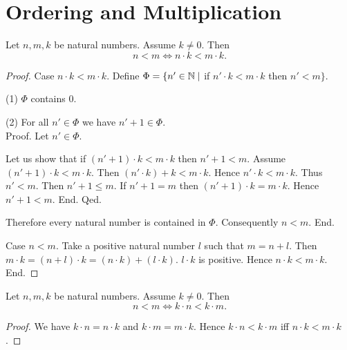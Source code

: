 \documentclass[10pt]{article}
\begin{document}
  \section{Ordering and Multiplication}

  \begin{forthel}
    \begin{proposition}
      Let $n, m, k$ be natural numbers.
      Assume $k \neq 0$.
      Then \[ n < m \iff n \cdot k < m \cdot k. \]
    \end{proposition}
    \begin{proof}
      Case $n \cdot k < m \cdot k$.
        Define $\Phi = \{ n' \in \mathbb{N} \mid$ if $n' \cdot k < m \cdot k$ then
        $n' < m \}$.

        (1) $\Phi$ contains $0$.

        (2) For all $n' \in \Phi$ we have $n' + 1 \in \Phi$. \\
        Proof.
          Let $n' \in \Phi$.

          Let us show that if $(n' + 1) \cdot k < m \cdot k$ then $n' + 1 < m$.
            Assume $(n' + 1) \cdot k < m \cdot k$.
            Then $(n' \cdot k) + k < m \cdot k$.
            Hence $n' \cdot k < m \cdot k$.
            Thus $n' < m$.
            Then $n' + 1 \leq m$.
            If $n' + 1 = m$ then $(n' + 1) \cdot k = m \cdot k$.
            Hence $n' + 1 < m$.
          End.
        Qed.

        Therefore every natural number is contained in $\Phi$.
        Consequently $n < m$.
      End.

      Case $n < m$.
        Take a positive natural number $l$ such that $m = n + l$.
        Then $m \cdot k = (n + l) \cdot k = (n \cdot k) + (l \cdot k)$.
        $l \cdot k$ is positive.
        Hence $n \cdot k < m \cdot k$.
      End.
    \end{proof}
  \end{forthel}

  \begin{forthel}
    \begin{corollary}
      Let $n, m, k$ be natural numbers.
      Assume $k \neq 0$.
      Then \[ n < m \iff k \cdot n < k \cdot m. \]
    \end{corollary}
    \begin{proof}
      We have $k \cdot n = n \cdot k$ and $k \cdot m = m \cdot k$.
      Hence $k \cdot n < k \cdot m$ iff $n \cdot k < m \cdot k$.
    \end{proof}
  \end{forthel}
\end{document}
